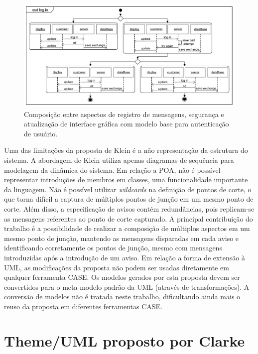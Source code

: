 \begin{figure}
	\centering
	\includegraphics[width=475px]{img/klein_composition.png}
	\caption{Composição entre aspectos de registro de mensagens, segurança e 
	atualização de interface gráfica com modelo
	base para autenticação de usuário.}\label{fig:klein_composition}
\end{figure}

Uma das limitações da proposta de Klein é a não representação da estrutura do sistema. A abordagem de Klein utiliza apenas diagramas de sequência para
modelagem da dinâmica do sistema. Em relação a POA, não é possível representar introduções de membros em classes, uma funcionalidade importante da
linguagem. Não é possível utilizar \textit{wildcards} na definição de pontos de corte, o que torna difícil a captura de múltiplos pontos de junção em
um mesmo ponto de corte. Além disso, a especificação de avisos contém redundâncias, pois replicam-se as mensagens referentes ao ponto de corte
capturado. A principal contribuição do trabalho é a possibilidade de realizar a composição de múltiplos aspectos em um mesmo ponto de junção, mantendo
as mensagens disparadas em cada aviso e identificando corretamente os pontos de junção, mesmo com mensagens introduzidas após a introdução de um
aviso. Em relação a forma de extensão à UML, as modificações da proposta não podem ser usadas diretamente em qualquer ferramenta CASE. Os modelos
gerados por esta proposta devem ser convertidos para o meta-modelo padrão da UML (através de transformações). A conversão de modelos não é tratada
neste trabalho, dificultando ainda mais o reuso da proposta em diferentes ferramentas CASE.

\section{Theme/UML proposto por Clarke}

